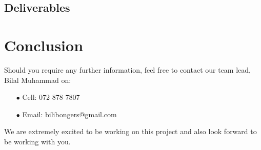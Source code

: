 \documentclass[a4paper,12pt]{article}
\begin{document}
	\newpage
	\subsection{Deliverables}
	
	
	\newpage
	\section{Conclusion}
	
	Should you require any further information, feel free to contact our team lead, Bilal Muhammad on:
	
	\begin{itemize}
		\item[$\bullet$]Cell: 072 878 7807
		\item[$\bullet$]Email: bilibongers@gmail.com
	\end{itemize}
	We are extremely excited to be working on this project and also look forward to be working with you.
	
	
\end{document}
